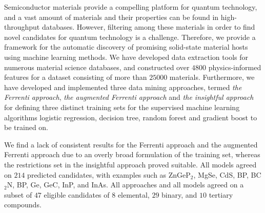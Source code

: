 Semiconductor materials provide a compelling platform for quantum technology, and a vast amount of materials and their properties can be found in high-throughput databases.
However, filtering among these materials in order to find novel candidates for quantum technology is a challenge. Therefore, we provide a framework for the automatic discovery of promising solid-state material hosts using machine learning methods.
We have developed data extraction tools for numerous material science databases, and constructed over $4800$ physics-informed features for a dataset consisting of more than $25000$ materials.
Furthermore, we have developed and implemented three data mining approaches, termed \textit{the Ferrenti approach}, \textit{the augmented Ferrenti approach} and \textit{the insightful approach} for defining three distinct training sets for the supervised machine learning algorithms logistic regression, decision tree, random forest and gradient boost to be trained on.

We find a lack of consistent results for the Ferrenti approach and the augmented Ferrenti approach due to an overly broad formulation of the training set, whereas the restrictions set in the insightful approach proved suitable. All models agreed on $214$ predicted candidates, with examples such as ZnGeP$_2$, MgSe, CdS, BP, BC$_2$N, BP, Ge, GeC, InP, and InAs. All approaches and all models agreed on a subset of $47$ eligible candidates of $8$ elemental, $29$ binary, and $10$ tertiary compounds.





